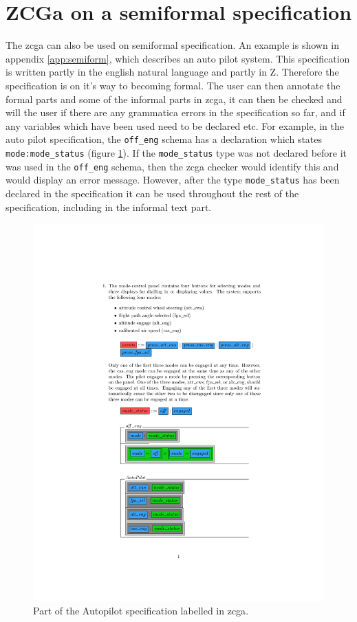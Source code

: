 \section{ZCGa on a semiformal specification}

The \gls{zcga} can also be used on semiformal specification. An example is shown
in appendix \ref{app:semiform}, which describes an auto pilot system. This
specification is written partly in the english natural language and partly in Z.
Therefore the specification is on it's way to becoming formal. The user can then
annotate the formal parts and some of the informal parts in \gls{zcga}, it can
then be checked and will the user if there are any grammatica errors in the
specification so far, and if any variables which have been used need to be
declared etc. For example, in the auto pilot specification, the \verb|off_eng|
schema has a declaration which states \verb|mode:mode_status| (figure
\ref{fig:zcgautopilot}). If the \verb|mode_status| type was not declared before
it was used in the \verb|off_eng| schema, then the \gls{zcga} checker would
identify this and would display an error message. However, after the type
\verb|mode_status| has been declared in the specification it can be used
throughout the rest of the specification, including in the informal text part.

\begin{figure}[H]
\centering
\includegraphics[clip, trim=3.5cm 10cm 1.5cm 2cm, scale=0.6]{examples/semiform/1.pdf}
\caption{Part of the Autopilot specification labelled in \gls{zcga}. \label{fig:zcgautopilot}}
\end{figure}

